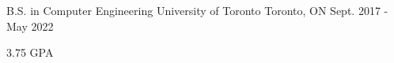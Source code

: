 

\begin{cventries}

  \cventry
    {B.S. in Computer Engineering} %
    {University of Toronto} %
    {Toronto, ON} %
    {Sept. 2017 - May 2022} %
    {
      \begin{cvitems} %
        \item {3.75 GPA}
      \end{cvitems}
    }

\end{cventries}

